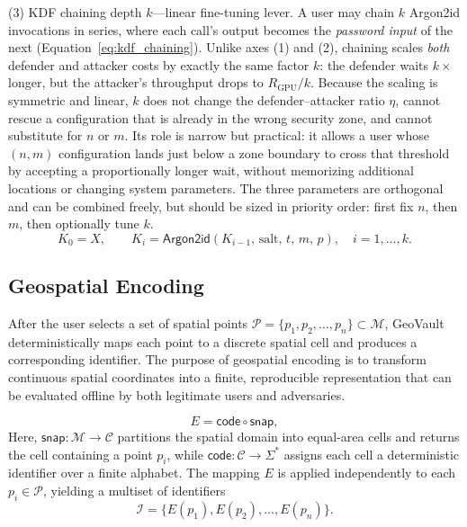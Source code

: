 \documentclass[mathematics,article,accept,pdftex,moreauthors]{Definitions/mdpi}
\begin{document}
{(3) KDF chaining depth $k$---linear fine-tuning lever. A user may chain $k$ Argon2id invocations in series, where each call's output becomes the \emph{password input} of the next (Equation~\eqref{eq:kdf_chaining}). Unlike axes (1) and (2), chaining scales \emph{both} defender and attacker costs by exactly the same factor $k$: the defender waits $k\times$ longer, but the attacker's throughput drops to $R_\text{GPU}/k$. Because the scaling is symmetric and linear, $k$ does not change the defender--attacker ratio $\eta$, cannot rescue a configuration that is already in the wrong security zone, and cannot substitute for $n$ or $m$. Its role is narrow but practical: it allows a user whose $(n, m)$ configuration lands just below a zone boundary to cross that threshold by accepting a proportionally longer wait, without memorizing additional locations or changing system parameters. The three parameters are orthogonal and can be combined freely, but should be sized in priority order: first fix $n$, then $m$, then optionally tune $k$.}
\begin{equation}
K_0 = X, \qquad K_i = \mathsf{Argon2id}(K_{i-1},\,\text{salt},\,t,\,m,\,p), \quad i = 1, \dots, k.
\label{eq:kdf_chaining}
\end{equation}


\subsection{Geospatial Encoding}
\label{sec:spatial_models}

After the user selects a set of spatial points $\mathcal{P} = \{p_1, p_2, \dots, p_n\} \subset \mathcal{M}$, GeoVault deterministically maps each point to a discrete spatial cell and produces a corresponding identifier. The purpose of geospatial encoding is to transform continuous spatial coordinates into a finite, reproducible representation that can be evaluated offline by both legitimate users and adversaries.

\begin{equation}
    E = \mathsf{code} \circ \mathsf{snap},
    \label{eq:encode_composition}
\end{equation}
Here, $\mathsf{snap}: \mathcal{M} \rightarrow \mathcal{C}$ partitions the spatial domain into equal-area cells and returns the cell containing a point $p_i$, while $\mathsf{code}: \mathcal{C} \rightarrow \Sigma^{*}$ assigns each cell a deterministic identifier over a finite alphabet. The mapping $E$ is applied independently to each $p_i \in \mathcal{P}$, yielding a multiset of identifiers
\begin{equation}
    \mathcal{I} = \{E(p_1), E(p_2), \dots, E(p_n)\}.
    \label{eq:identifier_multiset}
\end{equation}
\end{document}
